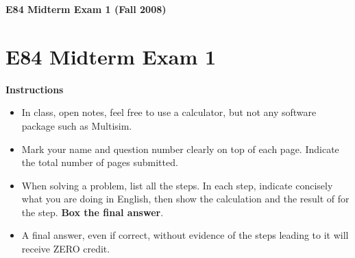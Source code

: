\usepackage{html}

\begin{center}
{\Large \bf  E84 Midterm Exam 1 (Fall 2008)}
\end{center}

\section*{E84 Midterm Exam 1}

{\bf Instructions}
\begin{itemize}
\item In class, open notes, feel free to use a calculator, but not any software package 
  such as Multisim. 
\item Mark your name and question number clearly on top of each page.
  Indicate the total number of pages submitted.
\item When solving a problem, list all the steps. In each step, indicate
  concisely what you are doing in English, then show the calculation 
  and the result of for the step. {\bf Box the final answer}.
\item  A final answer, even if correct, without evidence of the steps
  leading to it will receive ZERO credit.
\end{itemize}

